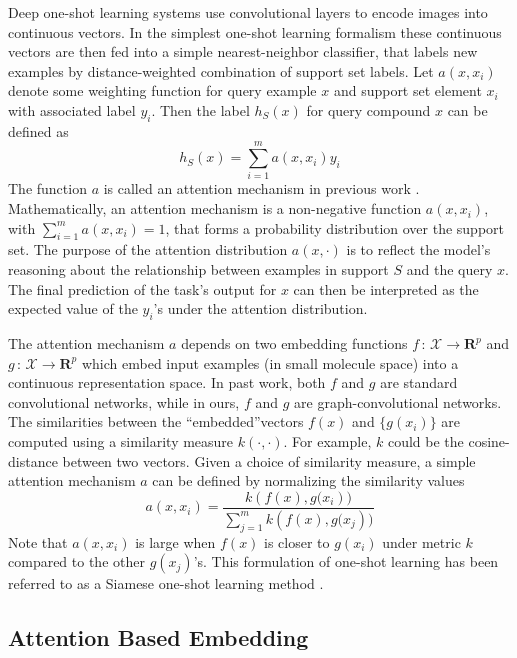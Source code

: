 \documentclass[journal=jacsat,manuscript=article]{achemso}
\begin{document}
Deep one-shot learning systems \cite{santoro2016one, vinyals2016matching} use convolutional layers to encode images into continuous vectors. In the simplest one-shot learning formalism these continuous vectors are then fed into a simple nearest-neighbor classifier, that labels new examples by distance-weighted combination of support set labels. Let $a(x, x_i)$ denote some weighting function for query example $x$ and support set element $x_i$ with associated label $y_i$. Then the label $h_S(x)$ for query compound $x$ can be defined as
\[
h_S(x) = \sum\limits_{i=1}^{m}a\left(x,x_i\right)y_i
\]
The function $a$ is called an attention mechanism in previous work \cite{vinyals2016matching}. Mathematically, an attention mechanism is a non-negative function $a(x,x_i)$, with $\sum\nolimits_{i=1}^{m}a(x,x_i)=1$, that forms a probability distribution over the support set. The purpose of the attention distribution $a(x, \cdot)$ is to reflect the model's reasoning about the relationship between examples in support $S$ and the query $x$. The final prediction of the task's output for $x$ can then be interpreted as the expected value of the $y_i$'s under the attention distribution.

The attention mechanism $a$ depends on two embedding functions $f\,:\,\mathcal{X}\rightarrow\mathbf{R}^p$ and $g\,:\,\mathcal{X}\rightarrow\mathbf{R}^p$ which embed input examples (in small molecule space) into a continuous representation space. In past work, both $f$ and $g$ are standard convolutional networks, while in ours, $f$ and $g$ are graph-convolutional networks. The similarities between the ``embedded''vectors $f(x)$ and $\{g(x_i)\}$ are computed using a similarity measure $k(\cdot,\cdot)$.  For example, $k$ could be the cosine-distance between two vectors. Given a choice of similarity measure, a simple attention mechanism $a$ can be defined by normalizing the similarity values
\[
a(x,x_i) = \frac{k\left(f(x),g(x_i\right))}{\sum\nolimits_{j=1}^{m} k\left(f(x),g(x_j\right))}
\]
Note that $a(x,x_i)$ is large when $f(x)$ is closer to $g(x_i)$ under metric $k$ compared to the other $g(x_j)$'s. This formulation of one-shot learning has been referred to as a Siamese one-shot learning method \cite{koch2015siamese}.


\subsection{Attention Based Embedding}
\end{document}
